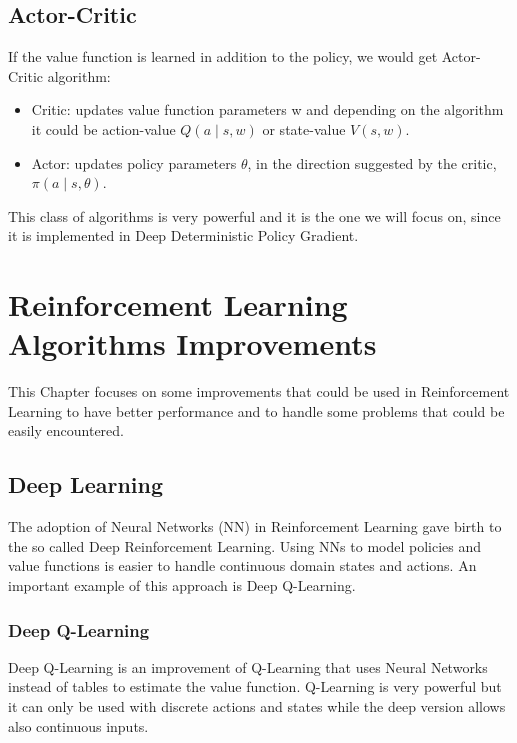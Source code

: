 \documentclass[Lau,oneside,noexaminfo]{sapthesis} %
\begin{document}
\section{Actor-Critic}
If the value function is learned in addition to the policy, we would get Actor-Critic algorithm:
\begin{itemize}
	\item Critic: updates value function parameters w and depending on the algorithm it could be action-value $Q(a\mid s,w)$ or state-value $V(s,w)$.
	\item Actor: updates policy parameters $\theta$, in the direction suggested by the critic, $\pi(a\mid s,\theta)$.
\end{itemize}
This class of algorithms is very powerful and it is the one we will focus on, since it is implemented in Deep Deterministic Policy Gradient.
\chapter{Reinforcement Learning Algorithms Improvements}
This Chapter focuses on some improvements that could be used in Reinforcement Learning to have better performance and to handle some problems that could be easily encountered.
\section{Deep Learning}
The adoption of Neural Networks (NN) in Reinforcement Learning gave birth to the so called Deep Reinforcement Learning. Using NNs to model policies and value functions is easier to handle continuous domain states and actions. An important example of this approach is Deep Q-Learning.
\subsection{Deep Q-Learning}
Deep Q-Learning is an improvement of Q-Learning that uses Neural Networks instead of tables to estimate the value function. Q-Learning is very powerful but it can only be used with discrete actions and states while the deep version allows also continuous inputs.
\end{document}

